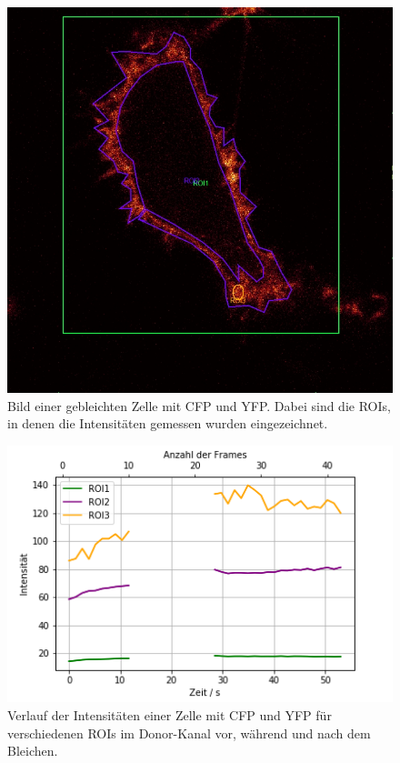 \begin{figure}[h]
    \centering
    \includegraphics[scale = 0.55]{Bilder/bleachROI.jpg}
    \caption{Bild einer gebleichten Zelle mit CFP und YFP. Dabei sind die ROIs, in denen die Intensitäten gemessen wurden eingezeichnet.}
    \label{bild:bleachROI}
\end{figure}

\begin{figure}[h]
    \centering
    \includegraphics[scale = 0.65]{Bilder/bleachPlotD.png}
    \caption{Verlauf der Intensitäten einer Zelle mit CFP und YFP für verschiedenen ROIs im Donor-Kanal vor, während und nach dem Bleichen.}
    \label{bild:bleachPlotD}
\end{figure}

